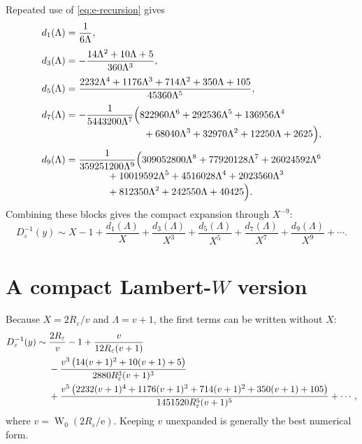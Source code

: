 \documentclass[11pt,a4paper,oneside]{book}
\newcommand{\e}{\mathrm e}
\newcommand{\W}{\operatorname W}
\newcommand{\eps}{\varepsilon}
\begin{document}
Repeated use of \cref{eq:e-recursion} gives
\begin{align}
 d_1(\Lambda)
 &=\frac{1}{6\Lambda},\label{eq:d1}\\[1mm]
 d_3(\Lambda)
 &=-\frac{14\Lambda^2+10\Lambda+5}
 {360\Lambda^3},\label{eq:d3}\\[1mm]
 d_5(\Lambda)
 &=\frac{
 2232\Lambda^4+1176\Lambda^3+714\Lambda^2
 +350\Lambda+105}
 {45360\Lambda^5},\label{eq:d5}\\[1mm]
 d_7(\Lambda)
 &=-\frac{1}{5443200\Lambda^7}
 \Bigl(
 822960\Lambda^6+292536\Lambda^5+136956\Lambda^4
 \notag\\[-1mm]
 &\hspace{28mm}
 +68040\Lambda^3+32970\Lambda^2+12250\Lambda+2625
 \Bigr),\label{eq:d7}\\[1mm]
 d_9(\Lambda)
 &=\frac{1}{359251200\Lambda^9}
 \Bigl(
 309052800\Lambda^8+77920128\Lambda^7
 +26024592\Lambda^6
 \notag\\[-1mm]
 &\hspace{15mm}
 +10019592\Lambda^5+4516028\Lambda^4
 +2023560\Lambda^3
 \notag\\[-1mm]
 &\hspace{15mm}
 +812350\Lambda^2+242550\Lambda+40425
 \Bigr).
 \label{eq:d9}
\end{align}
Combining these blocks gives the compact expansion through \(X^{-9}\):
\begin{equation}\label{eq:inverse-explicit-clean}
 D_\eps^{-1}(y)
 \sim X-1+\frac{d_1(\Lambda)}{X}
 +\frac{d_3(\Lambda)}{X^3}
 +\frac{d_5(\Lambda)}{X^5}
 +\frac{d_7(\Lambda)}{X^7}
 +\frac{d_9(\Lambda)}{X^9}+\cdots.
\end{equation}

\section{A compact \texorpdfstring{Lambert-\(W\)}{Lambert-W} version}

Because \(X=2R_\eps/v\) and \(\Lambda=v+1\), the first terms can be written
without \(X\):
\begin{align}
 D_\eps^{-1}(y)
 \sim{}&
 \frac{2R_\eps}{v}-1
 +\frac{v}{12R_\eps(v+1)}
 \notag\\
 &-\frac{
 v^3\left(14(v+1)^2+10(v+1)+5\right)}
 {2880R_\eps^3(v+1)^3}
 \notag\\
 &+\frac{
 v^5\left(
 2232(v+1)^4+1176(v+1)^3+714(v+1)^2
 +350(v+1)+105
 \right)}
 {1451520R_\eps^5(v+1)^5}
 +\cdots,
 \label{eq:inverse-v}
\end{align}
where \(v=\W_0(2R_\eps/\e)\).  Keeping \(v\) unexpanded is generally the best
numerical form.
\end{document}
